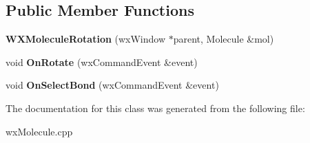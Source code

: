 \subsection*{Public Member Functions}
\begin{DoxyCompactItemize}
\item 
\mbox{\label{class_obj_cryst_1_1_w_x_molecule_rotation_ac6785eee3697f65388f8259822d0b0de}} 
{\bfseries W\+X\+Molecule\+Rotation} (wx\+Window $\ast$parent, Molecule \&mol)
\item 
\mbox{\label{class_obj_cryst_1_1_w_x_molecule_rotation_ab4aaf6510ea2e5863faeec623cb9f621}} 
void {\bfseries On\+Rotate} (wx\+Command\+Event \&event)
\item 
\mbox{\label{class_obj_cryst_1_1_w_x_molecule_rotation_aa8db9cd3bbdccfe845e47ab33fe4500c}} 
void {\bfseries On\+Select\+Bond} (wx\+Command\+Event \&event)
\end{DoxyCompactItemize}


The documentation for this class was generated from the following file\+:\begin{DoxyCompactItemize}
\item 
wx\+Molecule.\+cpp\end{DoxyCompactItemize}
